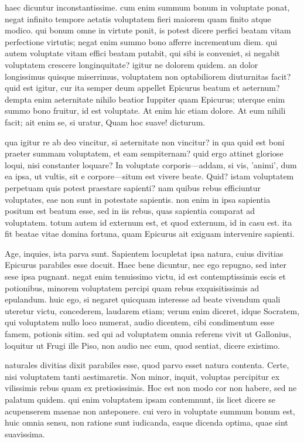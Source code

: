  haec dicuntur inconstantissime. cum enim summum bonum in voluptate ponat, negat infinito tempore aetatis voluptatem fieri maiorem quam finito atque modico. qui bonum omne in virtute ponit, is potest dicere perfici beatam vitam perfectione virtutis; negat enim summo bono afferre incrementum diem. qui autem voluptate vitam effici beatam putabit, qui sibi is conveniet, si negabit voluptatem crescere longinquitate? igitur ne dolorem quidem. an dolor longissimus quisque miserrimus, voluptatem non optabiliorem diuturnitas facit? quid est igitur, cur ita semper deum appellet Epicurus beatum et aeternum? dempta enim aeternitate nihilo beatior Iuppiter quam Epicurus; uterque enim summo bono fruitur, id est voluptate. At enim hic etiam dolore. At eum nihili facit; ait enim se, si uratur, Quam hoc suave! dicturum.

 qua igitur re ab deo vincitur, si aeternitate non vincitur? in qua quid est boni praeter summam voluptatem, et eam sempiternam? quid ergo attinet gloriose loqui, nisi constanter loquare? In voluptate corporis—addam, si vis, 'animi', dum ea ipsa, ut vultis, sit e corpore—situm est vivere beate. Quid? istam voluptatem perpetuam quis potest praestare sapienti? nam quibus rebus efficiuntur voluptates, eae non sunt in potestate sapientis. non enim in ipsa sapientia positum est beatum esse, sed in iis rebus, quas sapientia comparat ad voluptatem. totum autem id externum est, et quod externum, id in casu est. ita fit beatae vitae domina fortuna, quam Epicurus ait exiguam intervenire sapienti.

 Age, inquies, ista parva sunt. Sapientem locupletat ipsa natura, cuius divitias Epicurus parabiles esse docuit. Haec bene dicuntur, nec ego repugno, sed inter sese ipsa pugnant. negat enim tenuissimo victu, id est contemptissimis escis et potionibus, minorem voluptatem percipi quam rebus exquisitissimis ad epulandum. huic ego, si negaret quicquam interesse ad beate vivendum quali uteretur victu, concederem, laudarem etiam; verum enim diceret, idque Socratem, qui voluptatem nullo loco numerat, audio dicentem, cibi condimentum esse famem, potionis sitim. sed qui ad voluptatem omnia referens vivit ut Gallonius, loquitur ut Frugi ille Piso, non audio nec eum, quod sentiat, dicere existimo.

 naturales divitias dixit parabiles esse, quod parvo esset natura contenta. Certe, nisi voluptatem tanti aestimaretis. Non minor, inquit, voluptas percipitur ex vilissimis rebus quam ex pretiosissimis. Hoc est non modo cor non habere, sed ne palatum quidem. qui enim voluptatem ipsam contemnunt, iis licet dicere se acupenserem maenae non anteponere. cui vero in voluptate summum bonum est, huic omnia sensu, non ratione sunt iudicanda, eaque dicenda optima, quae sint suavissima.

